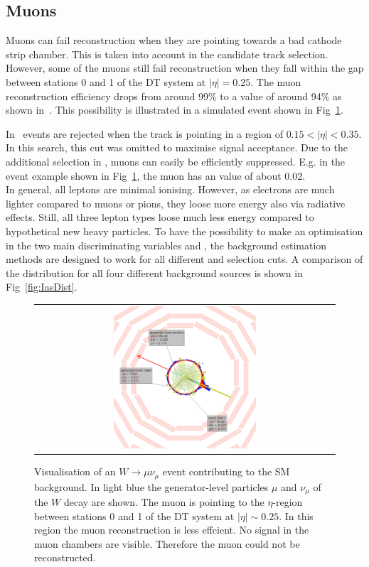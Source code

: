 \subsection*{Muons}
Muons can fail reconstruction when they are pointing towards a bad cathode strip chamber.
This is taken into account in the candidate track selection.
However, some of the muons still fail reconstruction when they fall within the gap between stations 0 and 1 of the DT system at $|\eta|=0.25$.
The muon reconstruction efficiency drops from around 99\% to a value of around 94\% as shown in~\cite{bib:CMS:DT_Thesis,bib:CMS:DT_8TeV_AN}.
This possibility is illustrated in a simulated event shown in Fig~\ref{fig:LostMuon}.


In~\cite{bib:CMS:DT_Thesis,bib:CMS:DT_8TeV_AN} events are rejected when the track is pointing in a region of $0.15<|\eta|<0.35$.
In this search, this cut was omitted to maximise signal acceptance. 
Due to the additional selection in \ias, muons can easily be efficiently suppressed.
E.g. in the event example shown in Fig~\ref{fig:LostMuon}, the muon has an \ias value of about 0.02.\\


In general, all leptons are minimal ionising.
However, as electrons are much lighter compared to muons or pions, they loose more energy also via radiative effects.
Still, all three lepton types loose much less energy compared to hypothetical new heavy particles.
To have the possibility to make an optimisation in the two main discriminating variables \pt and \ias, the background estimation methods are designed to work for all different \pt and \ias selection cuts.
A comparison of the \ias distribution for all four different background sources is shown in Fig~\ref{fig:IasDist}.
\begin{figure}[!tb]
  \centering 
  \begin{tabular}{c}
    \includegraphics[width=0.49\textwidth]{figures/analysis/LostMuon_Lumi_357583_Event_142918834.png}
  \end{tabular}
  \caption{Visualisation of an $W\rightarrow \mu\nu_{\mu}$ event contributing to the SM background. 
           In light blue the generator-level particles $\mu$ and $\nu_{\mu}$ of the $W$ decay are shown. 
           The muon is pointing to the $\eta$-region between stations 0 and 1 of the DT system at $|\eta|\sim0.25$.
           In this region the muon reconstruction is less effcient. No signal in the muon chambers are visible. Therefore the  muon could not be reconstructed.}
  \label{fig:LostMuon}
\end{figure}

